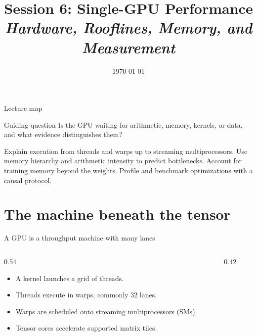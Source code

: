 \documentclass[handout]{beamer}
\title[TLM -- Session 06]{Session 6: Single-GPU Performance\\[4pt]
\normalsize\itshape Hardware, Rooflines, Memory, and Measurement}
\date{\today}
\begin{document}
\makelecturetitle

\begin{frame}{Lecture map}
  \tableofcontents
  \vfill
  \begin{block}{Guiding question}
    Is the GPU waiting for arithmetic, memory, kernels, or data, and what evidence distinguishes them?
  \end{block}
\end{frame}

\learninggoals
  {Explain execution from threads and warps up to streaming multiprocessors.}
  {Use memory hierarchy and arithmetic intensity to predict bottlenecks.}
  {Account for training memory beyond the weights.}
  {Profile and benchmark optimizations with a causal protocol.}

\section{The machine beneath the tensor}

\begin{frame}{A GPU is a throughput machine with many lanes}
  \begin{columns}[c]
    \begin{column}{0.54\linewidth}
      \begin{itemize}
        \setlength{\itemsep}{7pt}
        \item A kernel launches a grid of threads.
        \item Threads execute in warps, commonly 32 lanes.
        \item Warps are scheduled onto streaming multiprocessors (SMs).
        \item Tensor cores accelerate supported matrix tiles.
      \end{itemize}
    \end{column}
    \begin{column}{0.42\linewidth}
    \end{column}
  \end{columns}
\end{frame}
\end{document}
